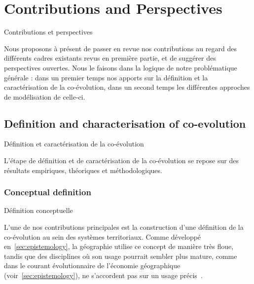 




\newpage


\section{Contributions and Perspectives}{Contributions et perspectives}

\label{sec:contributions}



Nous proposons à présent de passer en revue nos contributions au regard des différents cadres existants revus en première partie, et de suggérer des perspectives ouvertes. Nous le faisons dans la logique de notre problématique générale : dans un premier temps nos apports sur la définition et la caractérisation de la co-évolution, dans un second temps les différentes approches de modélisation de celle-ci.



\subsection{Definition and characterisation of co-evolution}{Définition et caractérisation de la co-évolution}


L'étape de définition et de caractérisation de la co-évolution se repose sur des résultats empiriques, théoriques et méthodologiques.


\subsubsection{Conceptual definition}{Définition conceptuelle}

L'une de nos contributions principales est la construction d'une définition de la co-évolution au sein des systèmes territoriaux. Comme développé en~\ref{sec:epistemology}, la géographie utilise ce concept de manière très floue, tandis que des disciplines où son usage pourrait sembler plus mature, comme dans le courant évolutionnaire de l'économie géographique (voir~\ref{sec:epistemology}), ne s'accordent pas sur un usage précis~\cite{schamp201020}.

